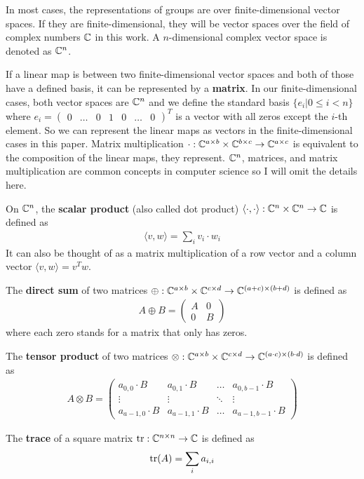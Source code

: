 In most cases, the representations of groups are over finite-dimensional vector spaces.
If they are finite-dimensional, they will be vector spaces over the field of complex numbers $\mathbb{C}$ in this work.
A $n$-dimensional complex vector space is denoted as $\mathbb{C}^n$.

If a linear map is between two finite-dimensional vector spaces and both of those have a defined basis, it can be represented by a \textbf{matrix}.
In our finite-dimensional cases, both vector spaces are $\mathbb{C}^n$ and we define the standard basis $\{e_i | 0 \leq i < n\}$ where $e_i = \begin{pmatrix} 0 & \ldots & 0 & 1 & 0 & \ldots & 0 \end{pmatrix}^T$ is a vector with all zeros except the $i$-th element.
So we can represent the linear maps as vectors in the finite-dimensional cases in this paper.
Matrix multiplication $\cdot: \mathbb{C}^{a \times b} \times \mathbb{C}^{b \times c} \to \mathbb{C}^{a \times c}$ is equivalent to the composition of the linear maps, they represent.
$\mathbb{C}^n$, matrices, and matrix multiplication are common concepts in computer science so I will omit the details here.

On $\mathbb{C}^n$, the \textbf{scalar product} (also called dot product) $\langle \cdot, \cdot \rangle: \mathbb{C}^n \times \mathbb{C}^n \to \mathbb{C}$ is defined as
\begin{align}
    \langle v, w \rangle = \sum_i v_i \cdot w_i
\end{align}
It can also be thought of as a matrix multiplication of a row vector and a column vector $\langle v, w \rangle = v^T w$.

The \textbf{direct sum} of two matrices $\oplus: \mathbb{C}^{a \times b} \times \mathbb{C}^{c \times d} \to \mathbb{C}^{(a + c) \times (b + d)}$ is defined as
\begin{align}
    A \oplus B = \begin{pmatrix}
        A & 0 \\
        0 & B
    \end{pmatrix}
\end{align}
where each zero stands for a matrix that only has zeros.

The \textbf{tensor product} of two matrices $\otimes: \mathbb{C}^{a \times b} \times \mathbb{C}^{c \times d} \to \mathbb{C}^{(a \cdot c) \times (b \cdot d)}$ is defined as
\begin{align}
    A \otimes B = \begin{pmatrix}
        a_{0, 0} \cdot B & a_{0, 1} \cdot B & \ldots & a_{0, b-1} \cdot B \\
        \vdots & \vdots & \ddots & \vdots \\
        a_{a-1, 0} \cdot B & a_{a-1, 1} \cdot B & \ldots & a_{a-1, b-1} \cdot B
    \end{pmatrix}
\end{align}

The \textbf{trace} of a square matrix $\text{tr}: \mathbb{C}^{n \times n} \to \mathbb{C}$ is defined as
\begin{align}
    \text{tr}(A) = \sum_i a_{i, i}
\end{align}

